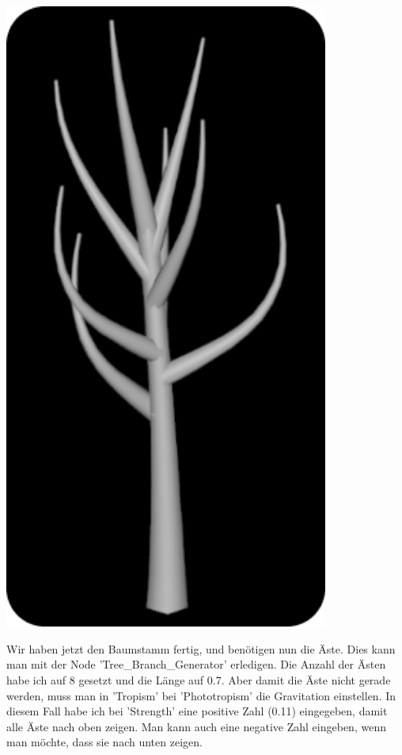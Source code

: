 \documentclass[paper=a4,fontsize=12pt,ngerman]{scrartcl}
\begin{document}
	\begin{minipage}{0.3\textwidth}
	\includegraphics[width=0.8\textwidth]{graphics/Ali4.png}
	\end{minipage}
	\begin{minipage}{0.7\textwidth}
	Wir haben jetzt den Baumstamm fertig, und benötigen nun die Äste. Dies kann man mit der Node 'Tree\_Branch\_Generator' erledigen. Die Anzahl der Ästen habe ich auf 8 gesetzt und die Länge auf 0.7. Aber damit die Äste nicht gerade werden, muss man in 'Tropism' bei 'Phototropism' die Gravitation einstellen. In diesem Fall habe ich bei 'Strength' eine positive Zahl (0.11) eingegeben, damit alle Äste nach oben zeigen. Man kann auch eine negative Zahl eingeben, wenn man möchte, dass sie nach unten zeigen. 
	\end{minipage}
\end{document}
